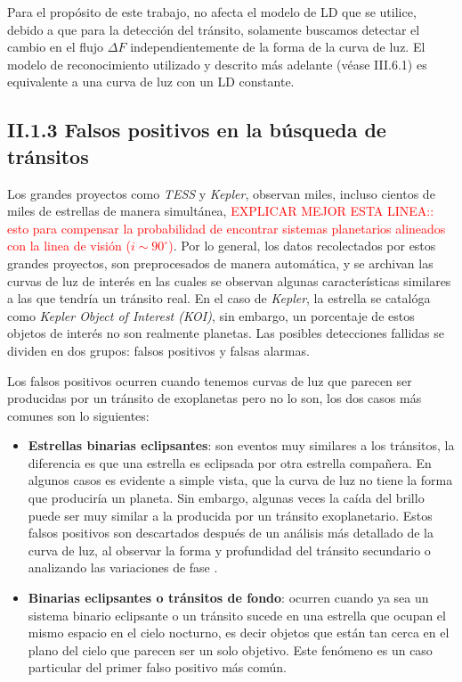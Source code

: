 Para el propósito de este trabajo, no afecta el modelo de LD que se utilice, debido a que para la detección del tránsito, solamente buscamos detectar el cambio en el flujo $\Delta F$ independientemente de la forma de la curva de luz. El modelo de reconocimiento utilizado y descrito más adelante (véase III.6.1) es equivalente a una curva de luz con un LD constante.

\subsection*{II.1.3 Falsos positivos en la búsqueda de tránsitos}

Los grandes proyectos como \textit{TESS} y \textit{Kepler}, observan miles, incluso cientos de miles de estrellas de manera simultánea, \textcolor{red}{EXPLICAR MEJOR ESTA LINEA:: esto para compensar la probabilidad de encontrar sistemas planetarios alineados con la linea de visión ($i\sim 90^{\circ}$)}. Por lo general, los datos recolectados por estos grandes proyectos, son preprocesados de manera automática, y se archivan las curvas de luz de interés en las cuales se observan algunas características similares a las que tendría un tránsito real. En el caso de \textit{Kepler}, la estrella se catalóga como \textit{Kepler Object of Interest (KOI)}, sin embargo, un porcentaje de estos objetos de interés no son realmente planetas. Las posibles detecciones fallidas se dividen en dos grupos: falsos positivos y falsas alarmas.

Los falsos positivos ocurren cuando tenemos curvas de luz que parecen ser producidas por un tránsito de exoplanetas pero no lo son, los dos casos más comunes son lo siguientes:

\begin{itemize}
\item \textbf{Estrellas binarias eclipsantes}: son eventos muy similares a los tránsitos, la diferencia es que una estrella es eclipsada por otra estrella compañera. En algunos casos es evidente a simple vista, que la curva de luz no tiene la forma que produciría un planeta. Sin embargo, algunas veces la caída del brillo puede ser muy similar a la producida por un tránsito exoplanetario. Estos falsos positivos son descartados después de un análisis más detallado de la curva de luz, al observar la forma y profundidad del tránsito secundario o analizando las variaciones de fase \cite{bryson2017kepler}.
\item \textbf{Binarias eclipsantes o tránsitos de fondo}: ocurren cuando ya sea un sistema binario eclipsante o un tránsito sucede en una estrella que ocupan el mismo espacio en el cielo nocturno, es decir objetos que están tan cerca en el plano del cielo que parecen ser un solo objetivo. Este fenómeno es un caso particular del primer falso positivo más común.
\end{itemize}

